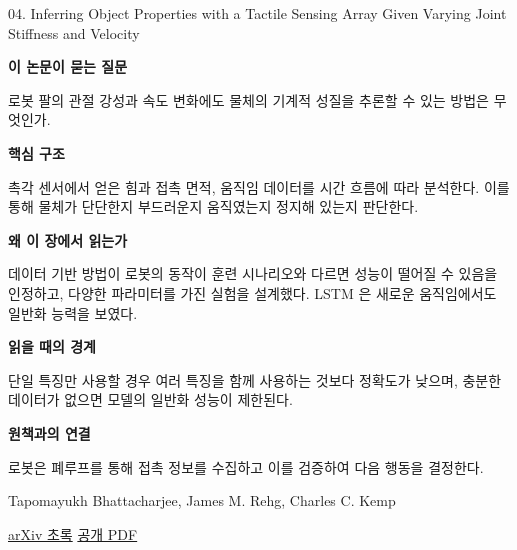 \documentclass[11pt,openany]{book}
\begin{document}
\begin{termcard}{04. Inferring Object Properties with a Tactile Sensing Array Given Varying Joint Stiffness and Velocity}

\par

\medskip

{\sffamily\bfseries\color{deepblue} 이 논문이 묻는 질문}\par

로봇 팔의 관절 강성과 속도 변화에도 물체의 기계적 성질을 추론할 수 있는 방법은 무엇인가.

\smallskip

{\sffamily\bfseries\color{deepblue} 핵심 구조}\par

촉각 센서에서 얻은 힘과 접촉 면적, 움직임 데이터를 시간 흐름에 따라 분석한다. 이를 통해 물체가 단단한지 부드러운지 움직였는지 정지해 있는지 판단한다.

\smallskip

{\sffamily\bfseries\color{deepblue} 왜 이 장에서 읽는가}\par

데이터 기반 방법이 로봇의 동작이 훈련 시나리오와 다르면 성능이 떨어질 수 있음을 인정하고, 다양한 파라미터를 가진 실험을 설계했다. LSTM 은 새로운 움직임에서도 일반화 능력을 보였다.

\smallskip

{\sffamily\bfseries\color{coral} 읽을 때의 경계}\par

단일 특징만 사용할 경우 여러 특징을 함께 사용하는 것보다 정확도가 낮으며, 충분한 데이터가 없으면 모델의 일반화 성능이 제한된다.

\smallskip

{\sffamily\bfseries\color{teal} 원책과의 연결}\par

로봇은 폐루프를 통해 접촉 정보를 수집하고 이를 검증하여 다음 행동을 결정한다.

\medskip

{\footnotesize\color{muted} Tapomayukh Bhattacharjee, James M. Rehg, Charles C. Kemp\par

\href{https://arxiv.org/abs/1409.4972}{arXiv 초록} \quad \href{https://arxiv.org/pdf/1409.4972}{공개 PDF}\par}

\end{termcard}
\end{document}
